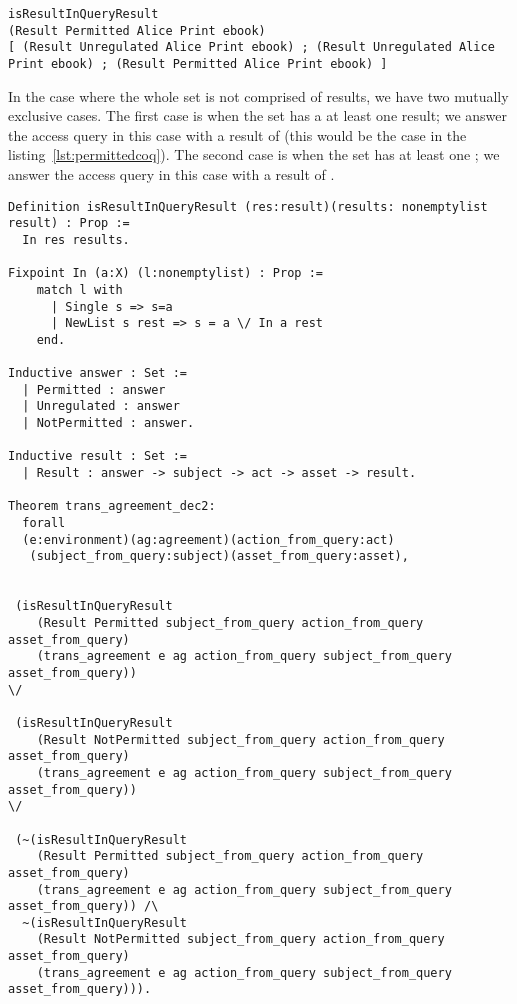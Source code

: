 \begin{lstlisting}
isResultInQueryResult
(Result Permitted Alice Print ebook) 
[ (Result Unregulated Alice Print ebook) ; (Result Unregulated Alice Print ebook) ; (Result Permitted Alice Print ebook) ]
\end{lstlisting}
    
In the case where the whole set is not comprised of  results, we have two mutually exclusive cases. The first case is when the set has a at least one  result; we answer the access query in this case with a result of  (this would be the case in the listing~\ref{lst:permittedcoq}). The second case is when the set has at least one ; we answer the access query in this case with a result of . 


\begin{minipage}[c]{0.95\textwidth}
\begin{lstlisting}
Definition isResultInQueryResult (res:result)(results: nonemptylist result) : Prop :=
  In res results.

Fixpoint In (a:X) (l:nonemptylist) : Prop :=
    match l with
      | Single s => s=a
      | NewList s rest => s = a \/ In a rest
    end.

Inductive answer : Set :=
  | Permitted : answer
  | Unregulated : answer
  | NotPermitted : answer.

Inductive result : Set :=
  | Result : answer -> subject -> act -> asset -> result.

Theorem trans_agreement_dec2:
  forall
  (e:environment)(ag:agreement)(action_from_query:act)
   (subject_from_query:subject)(asset_from_query:asset),


 (isResultInQueryResult 
    (Result Permitted subject_from_query action_from_query asset_from_query)
    (trans_agreement e ag action_from_query subject_from_query asset_from_query)) 
\/

 (isResultInQueryResult 
    (Result NotPermitted subject_from_query action_from_query asset_from_query)
    (trans_agreement e ag action_from_query subject_from_query asset_from_query))
\/

 (~(isResultInQueryResult 
    (Result Permitted subject_from_query action_from_query asset_from_query)
    (trans_agreement e ag action_from_query subject_from_query asset_from_query)) /\
  ~(isResultInQueryResult 
    (Result NotPermitted subject_from_query action_from_query asset_from_query)
    (trans_agreement e ag action_from_query subject_from_query asset_from_query))).

\end{lstlisting}
\end{minipage}

